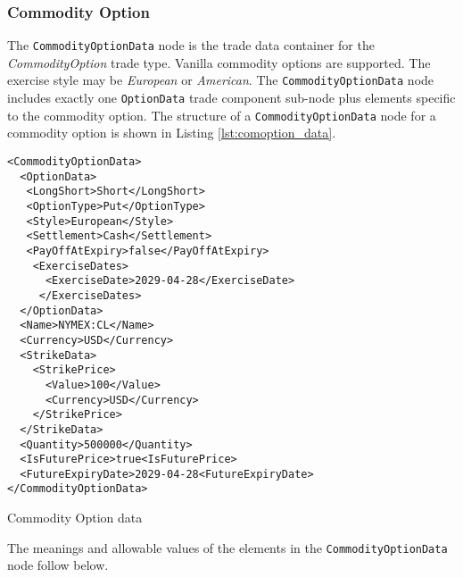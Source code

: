 \subsubsection{Commodity Option}
\label{ss:input_commodity_option}

The \lstinline!CommodityOptionData! node is the trade data container for the \emph{CommodityOption} trade type.  Vanilla commodity 
options are supported. The exercise style may be \emph{European} or \emph{American}. The \lstinline!CommodityOptionData! node includes exactly 
one \lstinline!OptionData! trade component sub-node plus elements specific to the commodity option. The structure of 
a \lstinline!CommodityOptionData! node for a commodity option is shown in Listing \ref{lst:comoption_data}.

\begin{listing}[H]
\begin{verbatim}
<CommodityOptionData>
  <OptionData>
   <LongShort>Short</LongShort>
   <OptionType>Put</OptionType>
   <Style>European</Style>
   <Settlement>Cash</Settlement>
   <PayOffAtExpiry>false</PayOffAtExpiry>
    <ExerciseDates>
      <ExerciseDate>2029-04-28</ExerciseDate>
     </ExerciseDates>
  </OptionData>
  <Name>NYMEX:CL</Name>
  <Currency>USD</Currency>
  <StrikeData>
    <StrikePrice>
      <Value>100</Value>
      <Currency>USD</Currency>
    </StrikePrice>
  </StrikeData>
  <Quantity>500000</Quantity>
  <IsFuturePrice>true<IsFuturePrice>
  <FutureExpiryDate>2029-04-28<FutureExpiryDate>
</CommodityOptionData>
\end{verbatim}
\caption{Commodity Option data}
\label{lst:comoption_data}
\end{listing}

The meanings and allowable values of the elements in the \lstinline!CommodityOptionData!  node follow below.


